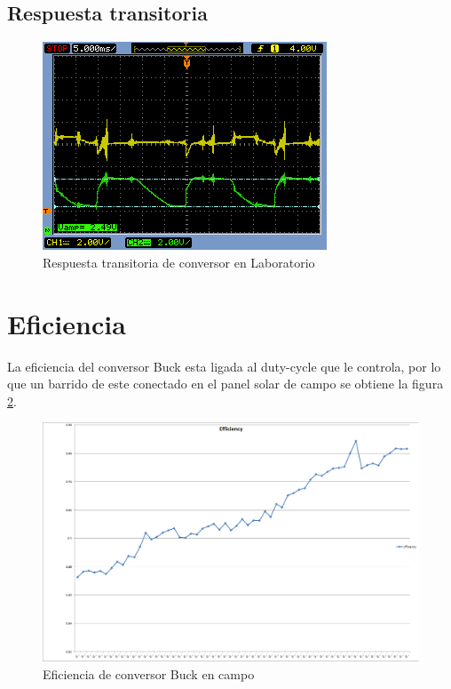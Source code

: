 \subsection{Respuesta transitoria}
\begin{figure}[H]
    \centering
    \includegraphics[width=1\linewidth,frame]{imagenes/testosc4.png}
    \caption{Respuesta transitoria de conversor en Laboratorio}
    \label{fig:resp_tran_lab}
\end{figure}
\section{Eficiencia}
La eficiencia del conversor Buck esta ligada al duty-cycle que le controla, por lo que un barrido de este conectado en el panel solar de campo se obtiene la figura \ref{fig:efficiency_solar_panel}.
\begin{figure}[H]
    \centering
    \includegraphics[width=1\linewidth]{imagenes/efficiency.png}
    \caption{Eficiencia de conversor Buck en campo}
    \label{fig:efficiency_solar_panel}
\end{figure}
